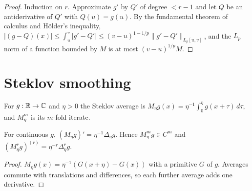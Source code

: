 \begin{proof}
\leanok
Induction on $r$. Approximate $g'$ by $Q'$ of degree $< r - 1$ and let $Q$ be an antiderivative of
$Q'$ with $Q(u) = g(u)$. By the fundamental theorem of calculus and Hölder's inequality,
$|(g - Q)(x)| \leq \int_u^v |g' - Q'| \leq (v - u)^{1 - 1/p} \|g' - Q'\|_{L_p[u, v]}$, and the
$L_p$ norm of a function bounded by $M$ is at most $(v - u)^{1/p} M$.
\end{proof}

\section{Steklov smoothing}

\begin{definition}
\label{def:steklov}
\leanok
For $g : \mathbb{R} \to \mathbb{C}$ and $\eta > 0$ the Steklov average is
$M_\eta g(x) = \eta^{-1} \int_0^\eta g(x + \tau) \, d\tau$, and $M_\eta^m$ is its $m$-fold
iterate.
\end{definition}

\begin{lemma}
\label{lem:steklov-deriv}
\leanok
{}
For continuous $g$, $(M_\eta g)' = \eta^{-1} \Delta_\eta g$. Hence $M_\eta^m g \in C^m$ and
$(M_\eta^r g)^{(r)} = \eta^{-r} \Delta_\eta^r g$.
\end{lemma}

\begin{proof}
\leanok
$M_\eta g(x) = \eta^{-1} (G(x + \eta) - G(x))$ with a primitive $G$ of $g$. Averages commute with
translations and differences, so each further average adds one derivative.
\end{proof}

